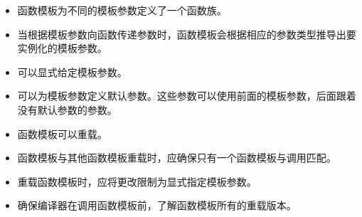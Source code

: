 
\begin{itemize}
\item
函数模板为不同的模板参数定义了一个函数族。

\item 
当根据模板参数向函数传递参数时，函数模板会根据相应的参数类型推导出要实例化的模板参数。

\item
可以显式给定模板参数。

\item 
可以为模板参数定义默认参数。这些参数可以使用前面的模板参数，后面跟着没有默认参数的参数。

\item
函数模板可以重载。

\item 
函数模板与其他函数模板重载时，应确保只有一个函数模板与调用匹配。

\item
重载函数模板时，应将更改限制为显式指定模板参数。

\item 
确保编译器在调用函数模板前，了解函数模板所有的重载版本。
\end{itemize}